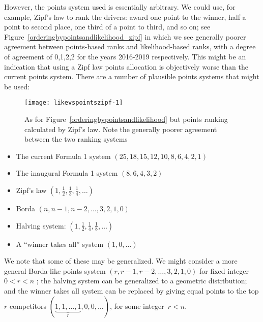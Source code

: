 \documentclass{elsarticle}
\begin{document}
However, the points system used is essentially arbitrary.  We could
use, for example, Zipf's law to rank the drivers: award one point to
the winner, half a point to second place, one third of a point to
third, and so on; see Figure~\ref{orderingbypointsandlikelihood_zipf}
in which we see generally poorer agreement between points-based ranks
and likelihood-based ranks, with a degree of agreement of 0,1,2,2 for
the years 2016-2019 respectively.  This might be an indication that
using a Zipf law points allocation is objectively worse than the
current points system.  There are a number of plausible points systems
that might be used:

\begin{figure}
{\centering \texttt{[image: likevspointszipf-1]}}
\caption[\doublespacing As for
  Figure~\ref{orderingbypointsandlikelihood} \label{orderingbypointsandlikelihood_zipf}
  but points ranking calculated by Zipf's law]{\doublespacing As for
  Figure~\ref{orderingbypointsandlikelihood} \label{orderingbypointsandlikelihood_zipf}
  but points ranking calculated by Zipf's law. Note the generally
  poorer agreement between the two ranking
  systems}\label{fig:likevspointszipf}
\end{figure}

\begin{itemize}
\item The current Formula 1 system $(25,18,15,12,10,8,6,4,2,1)$
\item The inaugural Formula 1 system $(8,6,4,3,2)$
\item Zipf's law $(1,\frac{1}{2},\frac{1}{3},\frac{1}{4},\ldots)$
\item Borda $(n,n-1,n-2,\ldots,3,2,1,0)$
\item Halving system:  $(1,\frac{1}{2},\frac{1}{4},\frac{1}{8},\ldots)$
\item A ``winner takes all'' system $(1,0,\ldots)$
\end{itemize}

We note that some of these may be generalized.  We might consider a
more general Borda-like points system $(r,r-1,r-2,\ldots,3,2,1,0)$ for
fixed integer $0<r<n$ \citep{emerson2007}; the halving system can be
generalized to a geometric distribution; and the winner takes all
system can be replaced by giving equal points to the top \(r\)
competitors $(\underbrace{1,1,\ldots ,1}_{r},0,0,\ldots)$, for some
integer~$r<n$.
\end{document}
